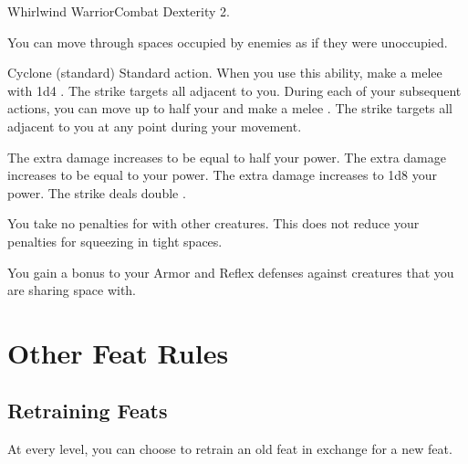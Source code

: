   \begin{feat}{Whirlwind Warrior}{Combat}
    \featpre Dexterity 2.

     You can move through spaces occupied by enemies as if they were unoccupied.

    \begin{sustainability}{Cyclone}{ (standard)}
      \abilityusagetime Standard action.
      \rankline
      When you use this ability, make a melee  with 1d4 .
      The strike targets all  adjacent to you.
      During each of your subsequent actions, you can move up to half your  and make a melee .
      The strike targets all  adjacent to you at any point during your movement.

      \rankline
       The extra damage increases to be equal to half your power.
       The extra damage increases to be equal to your power.
       The extra damage increases to 1d8 \add your power.
       The strike deals double .
    \end{sustainability}

     You take no penalties for \squeezing with other creatures.
    This does not reduce your penalties for squeezing in tight spaces.

     You gain a  bonus to your Armor and Reflex defenses against creatures that you are sharing space with.
  \end{feat}

\section{Other Feat Rules}

  \subsection{Retraining Feats}
    At every level, you can choose to retrain an old feat in exchange for a new feat.
